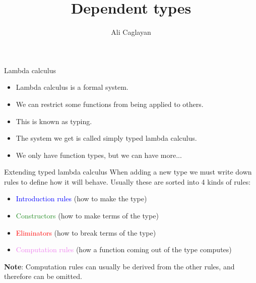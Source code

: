 \documentclass[usenames,dvipsnames]{beamer}
\title{Dependent types}
\author{Ali Caglayan}
\institute{University of Bath}
\newcommand{\blu}[1]{\textcolor{blue}{#1}}
\newcommand{\gre}[1]{\textcolor{ForestGreen}{#1}}
\newcommand{\red}[1]{\textcolor{red}{#1}}
\newcommand{\yel}[1]{\textcolor{violet}{#1}}
\begin{document}
    
    
    
    
    
    
    \begin{frame}{Lambda calculus}
        \begin{itemize}
            \item Lambda calculus is a formal system.
            \item We can restrict some functions from being applied to others.
            \item This is known as typing.
            \item The system we get is called simply typed lambda calculus.
            \item We only have function types, but we can have more...
        \end{itemize}
    \end{frame}
    
    \begin{frame}{Extending typed lambda calculus}
        When adding a new type we must write down rules to define how it will behave.
        Usually these are sorted into 4 kinds of rules:
        \begin{itemize}
            \item \blu{Introduction rules} (how to make the type)
            \item \gre{Constructors} (how to make terms of the type)
            \item \red{Eliminators} (how to break terms of the type)
            \item \yel{Computation rules} (how a function coming out of the type computes)
        \end{itemize}
        \textbf{Note}: Computation rules can usually be derived from the other rules, and therefore can be omitted.
    \end{frame}
\end{document}
